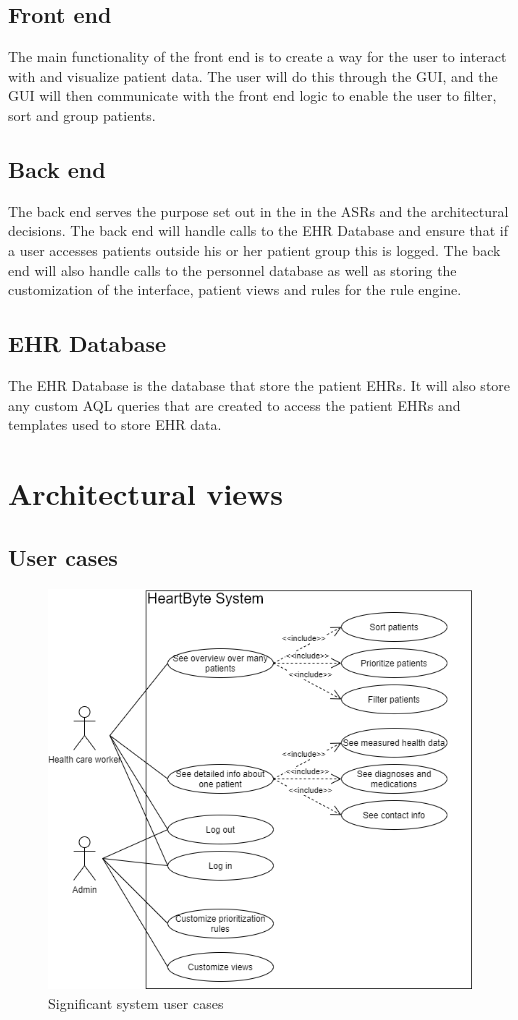 \documentclass{article}
\begin{document}
\subsection{Front end}
The main functionality of the front end is to create a way for the user to interact with and visualize patient data. The user will do this through the GUI, and the GUI will then communicate with the front end logic to enable the user to filter, sort and group patients. 

\subsection{Back end}
The back end serves the purpose set out in the in the ASRs and the architectural decisions. The back end will handle calls to the EHR Database and ensure that if a user accesses patients outside his or her patient group this is logged. The back end will also handle calls to the personnel database as well as storing the customization of the interface, patient views and rules for the rule engine.

\subsection{EHR Database}
The EHR Database is the database that store the patient EHRs. It will also store any custom AQL queries that are created to access the patient EHRs and templates used to store EHR data.


\section{Architectural views}
\subsection{User cases}
\begin{figure}[h]
    \centering
    \includegraphics[scale = 0.5]{user-cases}
    \caption{Significant system user cases}
    \label{fig:user-cases}
\end{figure}
\end{document}

